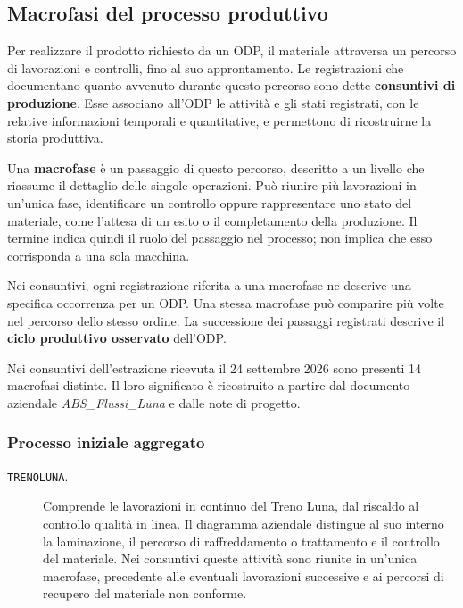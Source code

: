 \subsection{Macrofasi del processo produttivo}
\label{sec:production-phases}

Per realizzare il prodotto richiesto da un ODP, il materiale attraversa un percorso di lavorazioni e controlli, fino al suo approntamento. Le registrazioni che documentano quanto avvenuto durante questo percorso sono dette \textbf{consuntivi di produzione}. Esse associano all'ODP le attività e gli stati registrati, con le relative informazioni temporali e quantitative, e permettono di ricostruirne la storia produttiva.

Una \textbf{macrofase} è un passaggio di questo percorso, descritto a un livello che riassume il dettaglio delle singole operazioni. Può riunire più lavorazioni in un'unica fase, identificare un controllo oppure rappresentare uno stato del materiale, come l'attesa di un esito o il completamento della produzione. Il termine indica quindi il ruolo del passaggio nel processo; non implica che esso corrisponda a una sola macchina.

Nei consuntivi, ogni registrazione riferita a una macrofase ne descrive una specifica occorrenza per un ODP. Una stessa macrofase può comparire più volte nel percorso dello stesso ordine. La successione dei passaggi registrati descrive il \textbf{ciclo produttivo osservato} dell'ODP.

Nei consuntivi dell'estrazione ricevuta il 24 settembre 2026 sono presenti 14 macrofasi distinte. Il loro significato è ricostruito a partire dal documento aziendale \emph{ABS\_Flussi\_Luna} e dalle note di progetto.

\subsubsection{Processo iniziale aggregato}

\begin{description}
\item[\texttt{TRENOLUNA}.] Comprende le lavorazioni in continuo del Treno Luna, dal riscaldo al controllo qualità in linea. Il diagramma aziendale distingue al suo interno la laminazione, il percorso di raffreddamento o trattamento e il controllo del materiale. Nei consuntivi queste attività sono riunite in un'unica macrofase, precedente alle eventuali lavorazioni successive e ai percorsi di recupero del materiale non conforme.
\end{description}


